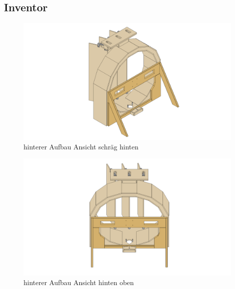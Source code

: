 \subsection{Inventor}
\begin{figure}[H]
    \centering
    \includegraphics[width=.92\textwidth]{../Inventor/hintererAufbau/png/hintererAufbau_hinten.png}
    \caption{hinterer Aufbau Ansicht schräg hinten}
\end{figure}
\begin{figure}[H]
    \centering
    \includegraphics[width=.92\textwidth]{../Inventor/hintererAufbau/png/hintererAufbau_hintenOben.png}
    \caption{hinterer Aufbau Ansicht hinten oben}
\end{figure}

